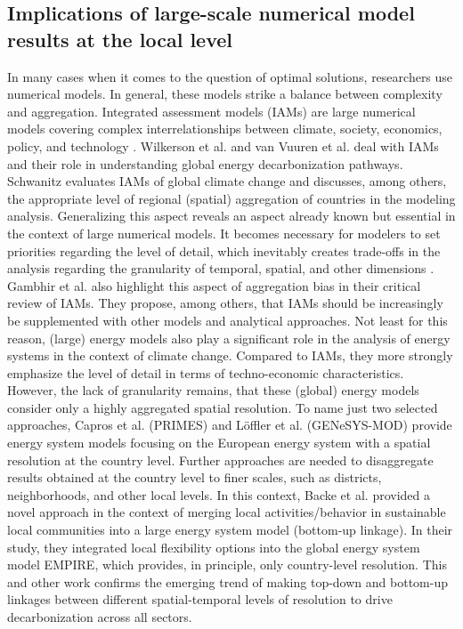 \subsection{Implications of large-scale numerical model results at the local level}
In many cases when it comes to the question of optimal solutions, researchers use numerical models. In general, these models strike a balance between complexity and aggregation. Integrated assessment models (IAMs) are large numerical models covering complex interrelationships between climate, society, economics, policy, and technology \cite{dowlatabadi1995integrated}. Wilkerson et al. \cite{wilkerson2015comparison} and van Vuuren et al. \cite{van2016carbon} deal with IAMs and their role in understanding global energy decarbonization pathways. Schwanitz \cite{schwanitz2013evaluating} evaluates IAMs of global climate change and discusses, among others, the appropriate level of regional (spatial) aggregation of countries in the modeling analysis. Generalizing this aspect reveals an aspect already known but essential in the context of large numerical models. It becomes necessary for modelers to set priorities regarding the level of detail, which inevitably creates trade-offs in the analysis regarding the granularity of temporal, spatial, and other dimensions \cite{gargiulo2013long}. Gambhir et al. \cite{gambhir2019review} also highlight this aspect of aggregation bias in their critical review of IAMs. They propose, among others, that IAMs should be increasingly be supplemented with other models and analytical approaches. Not least for this reason, (large) energy models also play a significant role in the analysis of energy systems in the context of climate change. Compared to IAMs, they more strongly emphasize the level of detail in terms of techno-economic characteristics. However, the lack of granularity remains, that these (global) energy models consider only a highly aggregated spatial resolution. To name just two selected approaches, Capros et al. \cite{capros2012model} (PRIMES) and Löffler et al. \cite{loffler2017designing} (GENeSYS-MOD) provide energy system models focusing on the European energy system with a spatial resolution at the country level. Further approaches are needed to disaggregate results obtained at the country level to finer scales, such as districts, neighborhoods, and other local levels. In this context, Backe et al. \cite{backe2021heat} provided a novel approach in the context of merging local activities/behavior in sustainable local communities into a large energy system model (bottom-up linkage). In their study, they integrated local flexibility options into the global energy system model EMPIRE, which provides, in principle, only country-level resolution. This and other work confirms the emerging trend of making top-down and bottom-up linkages between different spatial-temporal levels of resolution to drive decarbonization across all sectors.\vspace{0.3cm}

